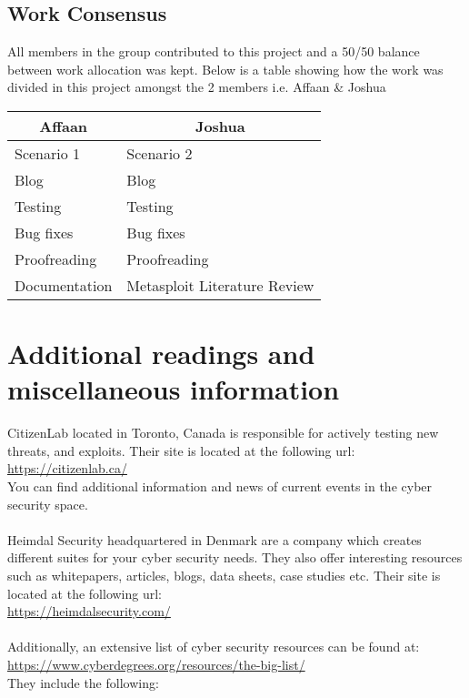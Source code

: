 \documentclass[a4paper, 12pt, titlepage]{report}
\begin{document}
\section{Work Consensus}
All members in the group contributed to this project and a 50/50 balance between work allocation was kept. Below is a table showing how the work was divided in this project amongst the 2 members i.e. Affaan \& Joshua
\begin{table}[H]
\centering
\begin{tabular}{@{}ll@{}}
\toprule
\multicolumn{1}{c}{Affaan}   & \multicolumn{1}{c}{Joshua}         \\ \midrule
Scenario 1     & Scenario 2             \\
Blog & Blog            \\
Testing                      & Testing                            \\
Bug fixes                    & Bug fixes                          \\
Proofreading                        & Proofreading                              \\
Documentation                & Metasploit Literature Review \\ \bottomrule
\end{tabular}
\end{table}
\chapter{Additional readings and miscellaneous information}
CitizenLab located in Toronto, Canada is responsible for actively testing new threats, and exploits. Their site is located at the following url:\\
\url{https://citizenlab.ca/}\\
You can find additional information and news of current events in the cyber security space.\\\\
Heimdal Security headquartered in Denmark are a company which creates different suites for your cyber security needs. They also offer interesting resources such as whitepapers, articles, blogs, data sheets, case studies etc. Their site is located at the following url:\\
\url{https://heimdalsecurity.com/}\\\\
Additionally, an extensive list of cyber security resources can be found at:\\
\url{https://www.cyberdegrees.org/resources/the-big-list/}\\
They include the following:
\end{document}
